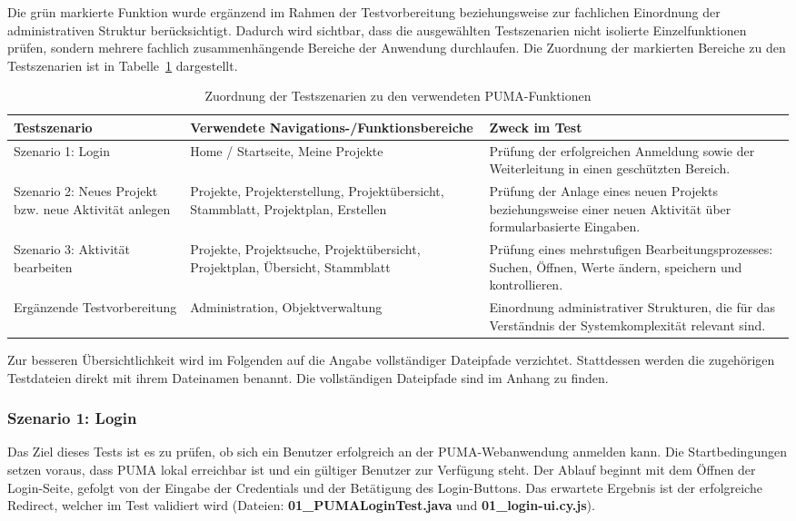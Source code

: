 Die grün markierte Funktion wurde ergänzend im Rahmen der Testvorbereitung beziehungsweise zur fachlichen Einordnung der administrativen Struktur berücksichtigt. Dadurch wird sichtbar, dass die ausgewählten Testszenarien nicht isolierte Einzelfunktionen prüfen, sondern mehrere fachlich zusammenhängende Bereiche der Anwendung durchlaufen. Die Zuordnung der markierten Bereiche zu den Testszenarien ist in Tabelle~\ref{tab:zuordnung_testszenarien_navigation} dargestellt. 

\begin{table}[htbp] 
    \centering 
    \renewcommand{\arraystretch}{1.3}
    \caption{Zuordnung der Testszenarien zu den verwendeten PUMA-Funktionen} 
    \label{tab:zuordnung_testszenarien_navigation} 
    \begin{tabular}{p{} p{} p{}} 
    \hline 
    \textbf{Testszenario} & \textbf{Verwendete Navigations-/Funktionsbereiche} & \textbf{Zweck im Test} \\ 
    \hline 
    Szenario 1: Login & Home / Startseite, Meine Projekte & Prüfung der erfolgreichen Anmeldung sowie der Weiterleitung in einen geschützten Bereich. \\ 
    \hline 
    Szenario 2: Neues Projekt bzw. neue Aktivität anlegen & Projekte, Projekterstellung, Projektübersicht, Stammblatt, Projektplan, Erstellen & Prüfung der Anlage eines neuen Projekts beziehungsweise einer neuen Aktivität über formularbasierte Eingaben. \\ 
    \hline 
    Szenario 3: Aktivität bearbeiten & Projekte, Projektsuche, Projektübersicht, Projektplan, Übersicht, Stammblatt & Prüfung eines mehrstufigen Bearbeitungsprozesses: Suchen, Öffnen, Werte ändern, speichern und kontrollieren. \\ 
    \hline 
    Ergänzende Testvorbereitung & Administration, Objektverwaltung & Einordnung administrativer Strukturen, die für das Verständnis der Systemkomplexität relevant sind. \\ 
    \hline 
    \end{tabular} 
\end{table}

Zur besseren Übersichtlichkeit wird im Folgenden auf die Angabe vollständiger Dateipfade verzichtet. Stattdessen werden die zugehörigen Testdateien direkt mit ihrem Dateinamen benannt. Die vollständigen Dateipfade sind im Anhang zu finden.

\subsubsection{Szenario 1: Login}
Das Ziel dieses Tests ist es zu prüfen, ob sich ein Benutzer erfolgreich an der PUMA-Webanwendung anmelden kann. Die Startbedingungen setzen voraus, dass PUMA lokal erreichbar ist und ein gültiger Benutzer zur Verfügung steht. Der Ablauf beginnt mit dem Öffnen der Login-Seite, gefolgt von der Eingabe der Credentials und der Betätigung des Login-Buttons. 
Das erwartete Ergebnis ist der erfolgreiche Redirect, welcher im Test validiert wird (Dateien: \textbf{01\_PUMALoginTest.java} und \textbf{01\_login-ui.cy.js}).

